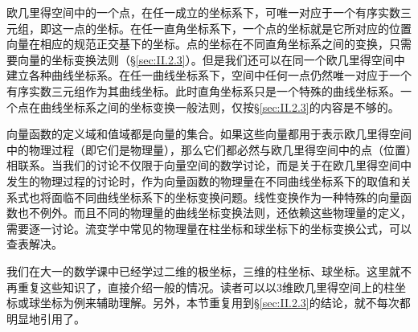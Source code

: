 \documentclass[main.tex]{subfiles}
\begin{document}
欧几里得空间中的一个点，在任一成立的坐标系下，可唯一对应于一个有序实数三元组，即这一点的坐标。在任一直角坐标系下，一个点的坐标就是它所对应的位置向量在相应的规范正交基下的坐标。点的坐标在不同直角坐标系之间的变换，只需要向量的坐标变换法则（\S\ref{sec:II.2.3}）。但是我们还可以在同一个欧几里得空间中建立各种曲线坐标系。在任一曲线坐标系下，空间中任何一点仍然唯一对应于一个有序实数三元组作为其曲线坐标。此时直角坐标系只是一个特殊的曲线坐标系。一个点在曲线坐标系之间的坐标变换一般法则，仅按\S\ref{sec:II.2.3}的内容是不够的。

向量函数的定义域和值域都是向量的集合。如果这些向量都用于表示欧几里得空间中的物理过程（即它们是物理量），那么它们都必然与欧几里得空间中的点（位置）相联系。当我们的讨论不仅限于向量空间的数学讨论，而是关于在欧几里得空间中发生的物理过程的讨论时，作为向量函数的物理量在不同曲线坐标系下的取值和关系式也将面临不同曲线坐标系下的坐标变换问题。线性变换作为一种特殊的向量函数也不例外。而且不同的物理量的曲线坐标变换法则，还依赖这些物理量的定义，需要逐一讨论。流变学中常见的物理量在柱坐标和球坐标下的坐标变换公式，可以查表解决。

我们在大一的数学课中已经学过二维的极坐标，三维的柱坐标、球坐标。这里就不再重复这些知识了，直接介绍一般的情况。读者可以以3维欧几里得空间上的柱坐标或球坐标为例来辅助理解。另外，本节重复用到\S\ref{sec:II.2.3}的结论，就不每次都明显地引用了。


\end{document}

